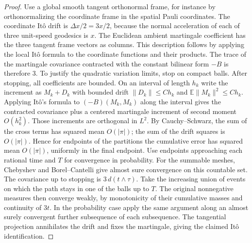 \documentclass[11pt,reqno]{amsart}
\theoremstyle{definition}
\theoremstyle{remark}
\numberwithin{equation}{section}
\begin{document}
\begin{proof}
Use a global smooth tangent orthonormal frame, for instance by
orthonormalizing the coordinate frame in the spatial Pauli coordinates.
The coordinate It\^o drift is \(\Delta x/2=3x/2\), because the
normal acceleration of each of three unit-speed geodesics is \(x\).
The Euclidean ambient martingale coefficient has the three tangent frame
vectors as columns. This description follows by applying the
local It\^o formula to the coordinate functions and their products.
The trace of the martingale covariance contracted with the constant
bilinear form \(-B\) is therefore \(3\). To justify the quadratic
variation limits, stop on compact balls. After stopping, all coefficients
are bounded. On an interval of length \(h_k\) write the increment as
\(M_k+D_k\) with bounded drift \(\|D_k\|\le C h_k\) and
\(\mathbb E\|M_k\|^2\le C h_k\). Applying It\^o's formula to
\((-B)(M_k,M_k)\) along the interval gives the contracted covariance
plus a centered martingale increment of second moment \(O(h_k^2)\).
Those increments are orthogonal in \(L^2\). By Cauchy--Schwarz,
the sum of the cross terms has squared mean \(O(|\pi|)\);
the sum of the drift squares is \(O(|\pi|)\). Hence for endpoints
of the partitions the cumulative error has squared mean
\(O(|\pi|)\), uniformly in the final endpoint. Use endpoints
approaching each rational time and \(T\) for convergence in
probability. For the summable meshes, Chebyshev and
Borel--Cantelli give almost sure convergence on this countable set.
The covariance up to stopping is \(3\,d(t\wedge\tau)\).
Take the increasing union of events on which the path stays in
one of the balls up to \(T\). The original nonnegative measures
then converge weakly, by monotonicity of their cumulative masses
and continuity of \(3t\). In the probability case apply the same
argument along an almost surely convergent further subsequence of
each subsequence. The tangential projection annihilates the drift
and fixes the martingale, giving the claimed It\^o identification.


\end{proof}
\end{document}
